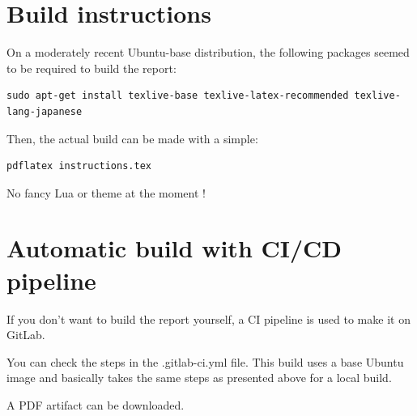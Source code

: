 \documentclass[10pt]{article}
\begin{document}
\section{Build instructions}
\label{sec:orgde831ee}
On a moderately recent Ubuntu-base distribution, the following packages seemed to be required to build the
report:

\begin{verbatim}
sudo apt-get install texlive-base texlive-latex-recommended texlive-lang-japanese
\end{verbatim}

Then, the actual build can be made with a simple:

\begin{verbatim}
pdflatex instructions.tex
\end{verbatim}

No fancy Lua or theme at the moment !

\section{Automatic build with CI/CD pipeline}
\label{sec:org900edbb}
If you don't want to build the report yourself, a CI pipeline is used to make it on GitLab.

You can check the steps in the .gitlab-ci.yml file.
This build uses a base Ubuntu image and basically takes the same steps as presented above for a local build.

A PDF artifact can be downloaded.
\end{document}
